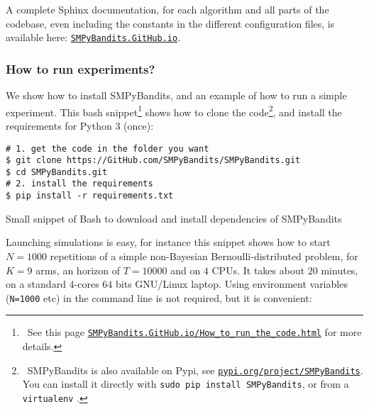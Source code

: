 A complete Sphinx documentation, for each algorithm and all parts of the codebase, even including the constants in the different configuration files, is available here: \texttt{\href{https://SMPyBandits.GitHub.io}{SMPyBandits.GitHub.io}}.


\subsubsection{How to run experiments?}

We show how to install SMPyBandits, and an example of how to run a simple experiment.
This bash snippet\footnote{~See this page \texttt{\href{https://SMPyBandits.GitHub.io/How_to_run_the_code.html}{SMPyBandits.GitHub.io/How\_to\_run\_the\_code.html}} for more details.} shows how to clone the code\footnote{~SMPyBandits is also available on Pypi, see \texttt{\href{https://pypi.org/project/SMPyBandits/}{pypi.org/project/SMPyBandits}}. You can install it directly with \texttt{sudo pip install SMPyBandits}, or from a \texttt{virtualenv} \cite{virtualenv}.},
and install the requirements for Python 3 (once):

\begin{small}
    \begin{listing}[h!]
        \begin{verbatim}
# 1. get the code in the folder you want
$ git clone https://GitHub.com/SMPyBandits/SMPyBandits.git
$ cd SMPyBandits.git
# 2. install the requirements
$ pip install -r requirements.txt
        \end{verbatim}
        \caption{Small snippet of Bash to download and install dependencies of SMPyBandits}
        \label{lst:3:howToInstallLibrary}
    \end{listing}
\end{small}

Launching simulations is easy, for instance this snippet shows how to start $N=1000$ repetitions of a simple non-Bayesian Bernoulli-distributed problem, for $K=9$ arms, an horizon of $T=10000$ and on $4$ CPUs.
It takes about $20$ minutes, on a standard $4$-cores $64$ bits GNU/Linux laptop.
Using environment variables (\texttt{N=1000} etc) in the command line is not required, but it is convenient:

